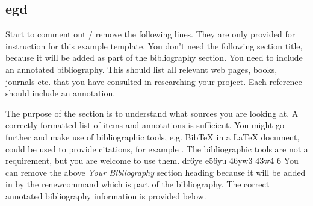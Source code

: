 \documentclass[11pt,fleqn,twoside]{article}
\begin{document}
\subsection{egd}
Start to comment out / remove the following lines. They are only provided for instruction for this example template.  You don't need the following section title, because it will be added as part of the bibliography section. 
%
%
%
You need to include an annotated bibliography. This should list all relevant web pages, books, journals etc. that you have consulted in researching your project. Each reference should include an annotation. 

The purpose of the section is to understand what sources you are looking at.  A correctly formatted list of items and annotations is sufficient. You might go further and make use of bibliographic tools, e.g. BibTeX in a LaTeX document, could be used to provide citations, for example \cite{NumericalRecipes} \cite{MarksPaper} \cite[99-101]{FailBlog} \cite{kittenpic_ref}.  The bibliographic tools are not a requirement, but you are welcome to use them.   
dr6ye e56yu 46yw3 43w4 6
You can remove the above {\em Your Bibliography} section heading because it will be added in by the renewcommand which is part of the bibliography. The correct annotated bibliography information is provided below. 
%
%


\nocite{*} %

\newpage
{} 

%
%

\end{document}
